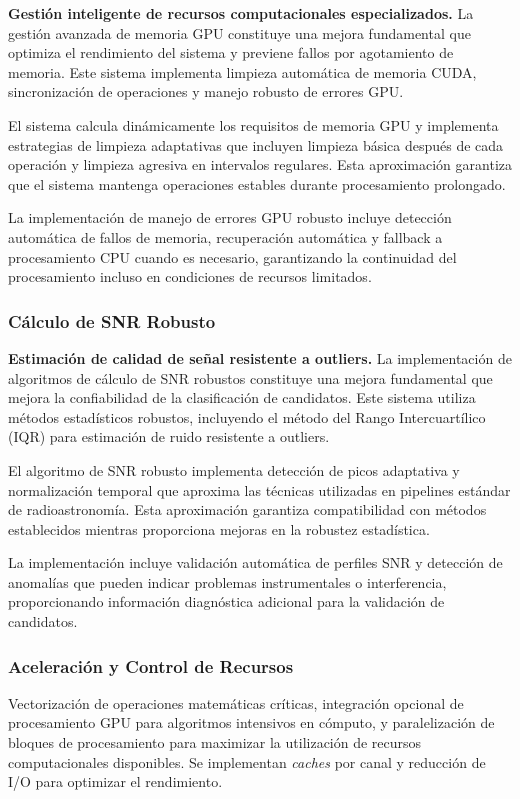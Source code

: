 \noindent\textbf{Gestión inteligente de recursos computacionales especializados.} La gestión avanzada de memoria GPU constituye una mejora fundamental que optimiza el rendimiento del sistema y previene fallos por agotamiento de memoria. Este sistema implementa limpieza automática de memoria CUDA, sincronización de operaciones y manejo robusto de errores GPU.

El sistema calcula dinámicamente los requisitos de memoria GPU y implementa estrategias de limpieza adaptativas que incluyen limpieza básica después de cada operación y limpieza agresiva en intervalos regulares. Esta aproximación garantiza que el sistema mantenga operaciones estables durante procesamiento prolongado.

La implementación de manejo de errores GPU robusto incluye detección automática de fallos de memoria, recuperación automática y fallback a procesamiento CPU cuando es necesario, garantizando la continuidad del procesamiento incluso en condiciones de recursos limitados.

\subsubsection{Cálculo de SNR Robusto}

\noindent\textbf{Estimación de calidad de señal resistente a outliers.} La implementación de algoritmos de cálculo de SNR robustos constituye una mejora fundamental que mejora la confiabilidad de la clasificación de candidatos. Este sistema utiliza métodos estadísticos robustos, incluyendo el método del Rango Intercuartílico (IQR) para estimación de ruido resistente a outliers.

El algoritmo de SNR robusto implementa detección de picos adaptativa y normalización temporal que aproxima las técnicas utilizadas en pipelines estándar de radioastronomía. Esta aproximación garantiza compatibilidad con métodos establecidos mientras proporciona mejoras en la robustez estadística.

La implementación incluye validación automática de perfiles SNR y detección de anomalías que pueden indicar problemas instrumentales o interferencia, proporcionando información diagnóstica adicional para la validación de candidatos.

\subsubsection{Aceleración y Control de Recursos}

Vectorización de operaciones matemáticas críticas, integración opcional de procesamiento GPU para algoritmos intensivos en cómputo, y paralelización de bloques de procesamiento para maximizar la utilización de recursos computacionales disponibles. Se implementan \textit{caches} por canal y reducción de I/O para optimizar el rendimiento.


